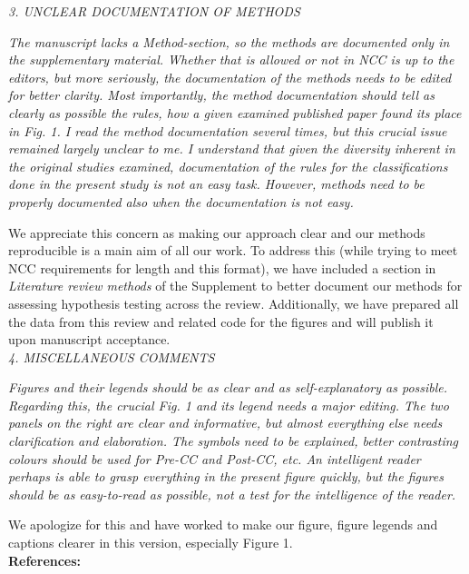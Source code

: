 \documentclass[11pt]{article}
\begin{document}
\emph{3. UNCLEAR DOCUMENTATION OF METHODS}

\emph{The manuscript lacks a Method-section, so the methods are documented only in the supplementary material. Whether that is allowed or not in NCC is up to the editors, but more seriously, the documentation of the methods needs to be edited for better clarity. Most importantly, the method documentation should tell as clearly as possible the rules, how a given examined published paper found its place in Fig. 1. I read the method documentation several times, but this crucial issue remained largely unclear to me. I understand that given the diversity inherent in the original studies examined, documentation of the rules for the classifications done in the present study is not an easy task. However, methods need to be properly documented also when the documentation is not easy.}

We appreciate this concern as making our approach clear and our methods reproducible is a main aim of all our work. To address this (while trying to meet NCC requirements for length and this format), we have included a section in \emph{Literature review methods} of the Supplement to better document our methods for assessing hypothesis testing across the review. Additionally, we have prepared all the data from this review and related code for the figures and will publish it upon manuscript acceptance. \\

\emph{4. MISCELLANEOUS COMMENTS}

\emph{Figures and their legends should be as clear and as self-explanatory as possible. Regarding this, the crucial Fig. 1 and its legend needs a major editing. The two panels on the right are clear and informative, but almost everything else needs clarification and elaboration. The symbols need to be explained, better contrasting colours should be used for Pre-CC and Post-CC, etc. An intelligent reader perhaps is able to grasp everything in the present figure quickly, but the figures should be as easy-to-read as possible, not a test for the intelligence of the reader.}

We apologize for this and have worked to make our figure, figure legends and captions clearer in this version, especially Figure 1. \\

\newpage
{\bf References:}

\end{document}
